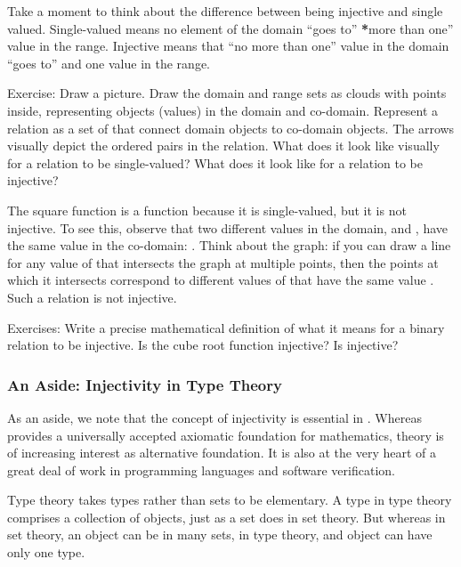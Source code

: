 \documentclass[letterpaper,10pt,english]{sphinxmanual}
\begin{document}
Take a moment to think about the difference between being injective
and single valued. Single-valued means no  element of the domain
“goes to” {\color{red}\bfseries{}*}more than one” value in the range. Injective means that “no
more than one” value in the domain “goes to” and one value in the
range.

Exercise: Draw a picture. Draw the domain and range sets as clouds
with points inside, representing objects (values) in the domain and
co-domain. Represent a relation as a set of  that connect
domain objects to co-domain objects. The arrows visually depict the
ordered pairs in the relation. What does it look like visually for a
relation to be single-valued? What does it look like for a relation to
be injective?

The square function is a function because it is single-valued, but it
is not injective. To see this, observe that two different values in
the domain,  and , have the same value in the co-domain: .
Think about the graph: if you can draw a  line for any
value of  that intersects the graph at multiple points, then the
points at which it intersects correspond to different values of 
that have the same value . Such a relation is not
injective.

Exercises: Write a precise mathematical definition of what it means
for a binary relation to be injective.  Is the cube root function
injective? Is  injective?


\subsubsection{An Aside: Injectivity in Type Theory}
\label{\detokenize{07-set-theory:an-aside-injectivity-in-type-theory}}
As an aside, we note that the concept of injectivity is essential in
.  Whereas  provides a universally accepted
axiomatic foundation for mathematics,  theory is of increasing
interest as alternative foundation. It is also at the very heart of a
great deal of work in programming languages and software verification.

Type theory takes types rather than sets to be elementary. A type in
type theory comprises a collection of objects, just as a set does in
set theory. But whereas in set theory, an object can be in many sets,
in type theory, and object can have only one type.
\end{document}
